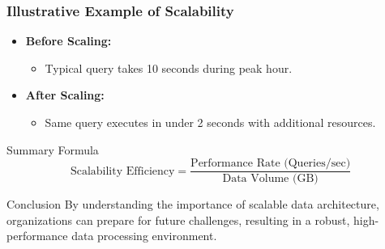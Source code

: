 \documentclass[aspectratio=169]{beamer}
\begin{document}
\begin{frame}[fragile]
    \frametitle{Illustrative Example of Scalability}
    \begin{itemize}
        \item \textbf{Before Scaling:}
        \begin{itemize}
            \item Typical query takes 10 seconds during peak hour.
        \end{itemize}
        \item \textbf{After Scaling:}
        \begin{itemize}
            \item Same query executes in under 2 seconds with additional resources.
        \end{itemize}
    \end{itemize}
    
    \begin{block}{Summary Formula}
        \begin{equation}
            \text{Scalability Efficiency} = \frac{\text{Performance Rate (Queries/sec)}}{\text{Data Volume (GB)}}
        \end{equation}
    \end{block}

    \begin{block}{Conclusion}
        By understanding the importance of scalable data architecture, organizations can prepare for future challenges, resulting in a robust, high-performance data processing environment.
    \end{block}
\end{frame}
\end{document}
